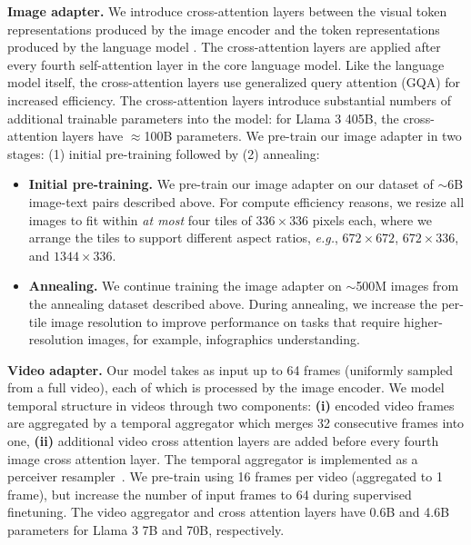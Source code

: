 \textbf{Image adapter.} We introduce cross-attention layers between the visual token representations produced by the image encoder and the token representations produced by the language model \citep{alayrac2022flamingo}.
The cross-attention layers are applied after every fourth self-attention layer in the core language model.
Like the language model itself, the cross-attention layers use generalized query attention (GQA) for increased efficiency.
The cross-attention layers introduce substantial numbers of additional trainable parameters into the model: for Llama 3 405B, the cross-attention layers have $\approx$100B parameters.
We pre-train our image adapter in two stages: (1) initial pre-training followed by (2) annealing:
\begin{itemize}
\item \textbf{Initial pre-training.} We pre-train our image adapter on our dataset of  $\sim$6B image-text pairs described above.
For compute efficiency reasons, we resize all images to fit within \emph{at most} four tiles of $336 \times 336$ pixels each, where we arrange the tiles to support different aspect ratios, \emph{e.g.}, $672 \times 672$, $672 \times 336$, and $1344 \times 336$.

\item \textbf{Annealing.}
We continue training the image adapter on $\sim$500M images from the annealing dataset described above.
During annealing, we increase the per-tile image resolution to improve performance on tasks that require higher-resolution images, for example, infographics understanding.
\end{itemize}

\textbf{Video adapter.} Our model takes as input up to 64 frames (uniformly sampled from a full video), each of which is processed by the image encoder.
We model temporal structure in videos through two components: \textbf{(i)} encoded video frames are aggregated by a temporal aggregator which merges 32 consecutive frames into one, \textbf{(ii)} additional video cross attention layers are added before every fourth image cross attention layer.
The temporal aggregator is implemented as a perceiver resampler~\citep{jaegle2021perceiver,alayrac2022flamingo}.
We pre-train using 16 frames per video (aggregated to 1 frame), but increase the number of input frames to 64 during supervised finetuning.
The video aggregator and cross attention layers have 0.6B and 4.6B parameters for Llama 3 7B and 70B, respectively. 



